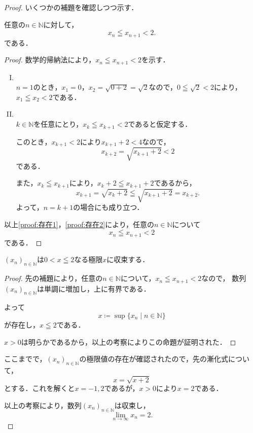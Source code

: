 \documentclass[a4paper,11pt]{ltjsarticle}
\newenvironment{tleftbar}{\begin{tbleftline}\setlength{\parindent}{1\zw}}{\end{tbleftline}}
\newenvironment{dotleftbar}{%
  \begin{tbdotleftline}\setlength{\parindent}{1\zw}%
}{%
  \end{tbdotleftline}%
}
\begin{document}
\begin{tleftbar}
  \begin{proof}
    いくつかの補題を確認しつつ示す．
\begin{lemma}{}{}
  任意の$n \in \mathbb{N}$に対して，
  \[
  x_n \leqq x_{n+1} < 2.
  \]
  である．
\end{lemma}

\begin{dotleftbar}
\begin{proof}
  数学的帰納法により，$x_n \leqq x_{n+1} < 2$を示す．
  \begin{enumerate}[(I)]
    \item \mbox{} \\ \label{proof:存在1}
    $n=1$のとき，$ x_1 =0$，$x_2= \sqrt{0+2}=\sqrt{2}$なので，$ 0 \leqq \sqrt{2} < 2$により，
    $x_1 \leqq x_2 < 2$である．
    \item \mbox{} \\ \label{proof:存在2}
    $k \in \mathbb{N}$を任意にとり，$x_k \leqq x_{k+1} < 2$であると仮定する．

    このとき，$x_{k+1} < 2$により$ x_{k+1}+2 < 4$なので，
    \[
    x_{k+2}=\sqrt{x_{k+1} + 2} < 2
    \]
    である．

    また，$x_k \leqq x_{k+1}$により，$x_k +2  \leqq x_{k+1}+2$であるから，
    \[
    x_{k+1}= \sqrt{x_k +2} \leqq \sqrt{x_{k+1}+2}=x_{k+2}.
    \]
    よって，$n=k+1$の場合にも成り立つ．
  \end{enumerate}
  以上\ref{proof:存在1}，\ref{proof:存在2}により，任意の$n \in \mathbb{N}$について
  \[
  x_n \leqq x_{n+1} < 2
  \]
  である．
\end{proof}
\end{dotleftbar}

\begin{lemma}{}{}
  $(x_n)_{n \in \mathbb{N}}$は$ 0<  x \leqq 2$なる極限$x$に収束する．
\end{lemma}

\begin{dotleftbar}
\begin{proof}
先の補題により，任意の$n \in \mathbb{N}$について，$ x_n \leqq x_{n+1} <2$なので，
数列$(x_n)_{n \in \mathbb{N}}$は単調に増加し，上に有界である．

よって
\[
x \coloneqq \sup \{ x_n \mid n \in \mathbb{N} \}
\]
が存在し，$x \leqq  2$である．

$ x>0$は明らかであるから，以上の考察によりこの命題が証明された．
\end{proof}
\end{dotleftbar}

ここまでで，$(x_n)_{n \in \mathbb{N}}$の極限値の存在が確認されたので，先の漸化式について，
\[
x=\sqrt{x+2}
\]
とする．これを解くと$ x= -1,2$であるが，$x>0$により$x=2$である．

以上の考察により，数列$(x_n)_{n \in \mathbb{N}}$は収束し，
\[
\lim_{n \to \infty} x_n =2.
\]
\end{proof}
\end{tleftbar}
\end{document}
